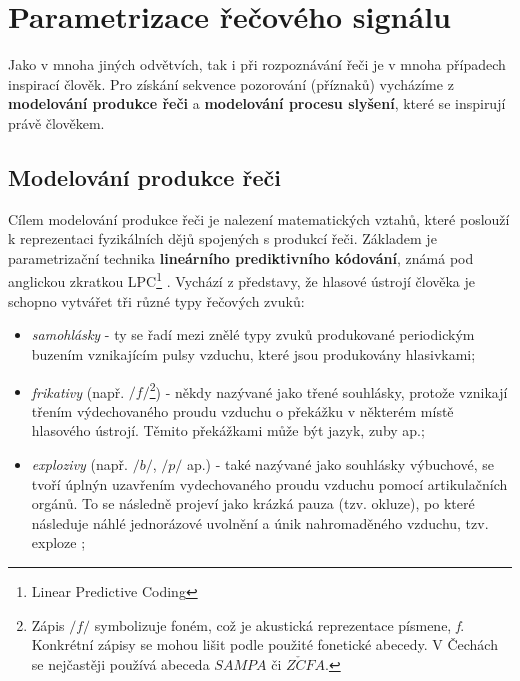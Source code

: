 \section{Parametrizace řečového signálu}
\label{chap:asr:parametrization}

Jako v mnoha jiných odvětvích, tak i při rozpoznávání řeči je v mnoha případech inspirací člověk. Pro získání sekvence pozorování (příznaků) vycházíme z \textbf{modelování produkce řeči} a \textbf{modelování procesu slyšení}, které se inspirují právě člověkem.

\subsection{Modelování produkce řeči}
\label{chap:asr:parametrization:production}

Cílem modelování produkce řeči je nalezení matematických vztahů, které poslouží k reprezentaci fyzikálních dějů spojených s produkcí řeči. Základem je parametrizační technika \textbf{lineárního prediktivního kódování}, známá pod anglickou zkratkou LPC\footnote{Linear Predictive Coding} \cite{Benesty2007}. Vychází z představy, že hlasové ústrojí člověka je schopno vytvářet tři různé typy řečových zvuků:

\begin{itemize}
  \item \textit{samohlásky} - ty se řadí mezi znělé typy zvuků produkované periodickým buzením vznikajícím pulsy vzduchu, které jsou produkovány hlasivkami;
  \item \textit{frikativy} (např. $/f/$\footnote{Zápis $/f/$ symbolizuje foném, což je akustická reprezentace písmene, \textit{f}. Konkrétní zápisy se mohou lišit podle použité fonetické abecedy. V Čechách se nejčastěji používá abeceda $SAMPA$ či $Z\check{C}FA$.}) - někdy nazývané jako třené souhlásky, protože vznikají třením výdechovaného proudu vzduchu o překážku v některém místě hlasového ústrojí. Těmito překážkami může být jazyk, zuby ap.;
  \item \textit{explozivy} (např. $/b/$, $/p/$ ap.) - také nazývané jako souhlásky výbuchové, se tvoří úplnýn uzavřením vydechovaného proudu vzduchu pomocí artikulačních orgánů. To se následně projeví jako krázká pauza (tzv. okluze), po které následuje náhlé jednorázové uvolnění a únik nahromaděného vzduchu, tzv. exploze \cite{Psutka2006};
\end{itemize}

